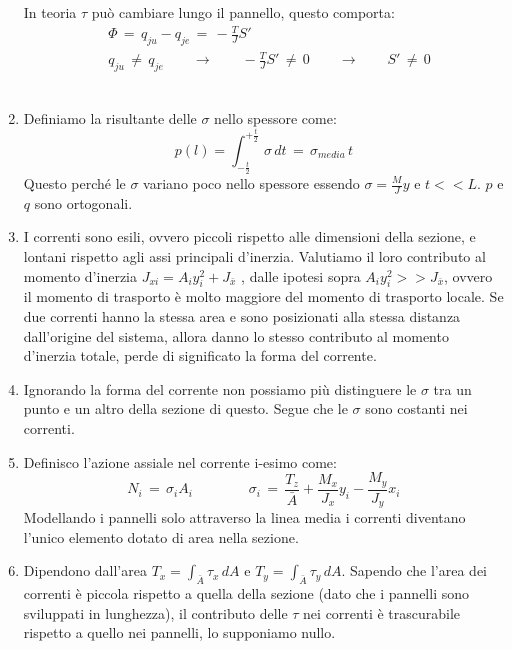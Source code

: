 \begin{enumerate}
    In teoria $\tau$ può cambiare lungo il pannello, questo comporta:
    \begin{align*}
        &\Phi\, = \, q_{ju} -q_{je}\,=\, -\frac{T}{J}S'\\
        &q_{ju} \,\neq\, q_{je}  \quad \quad \rightarrow  \quad \quad  -\frac{T}{J}S'\,\neq\, 0 \quad \quad \rightarrow  \quad \quad S'\,\neq\, 0
    \end{align*}\\
    \item Definiamo la risultante delle $\sigma$ nello spessore come:
    \begin{equation*}
        p(l) = \int_{-\frac{t}{2}}^{+\frac{t}{2}} \, \sigma \,dt\,= \, \sigma_{media} \,t
    \end{equation*}
    Questo perché le $\sigma$ variano poco nello spessore essendo $\sigma = \frac{M}{J}y$ e $t<<L$.
    $p$ e $q$ sono ortogonali.\\
    \item I correnti sono esili, ovvero piccoli rispetto alle dimensioni della sezione, e lontani rispetto agli assi principali d'inerzia. Valutiamo  il loro contributo al momento d'inerzia $J_{xi}= A_iy_i^2 + J_{\bar{x}}$ , dalle ipotesi sopra $A_iy_i^2 >> J_{\bar{x}}$, ovvero il momento di trasporto è molto maggiore del momento di trasporto locale. Se due correnti hanno la stessa area e sono posizionati alla stessa distanza dall'origine del sistema, allora danno lo stesso contributo al momento d'inerzia totale, perde di significato la forma del corrente.\\
    \item Ignorando la forma del corrente non possiamo più distinguere le $\sigma$ tra un punto e un altro della sezione di questo. Segue che le $\sigma$ sono costanti nei correnti.\\
    \item Definisco l'azione assiale nel corrente i-esimo come:
    \begin{equation*}
        N_i \,=\, \sigma_i A_i
        \quad  \quad  \quad  \quad
        \sigma_i\,=\,
         \frac{T_z}{ \bar{A}} 
        + \frac{M_x}{ J_x} y_i
        - \frac{M_y}{ J_y} x_i
    \end{equation*}
    Modellando i pannelli solo attraverso la linea media i correnti diventano l'unico elemento dotato di area nella sezione.   \\
    \item Dipendono dall'area $T_x = \int_{\bar{A}}\tau_x\,dA$ e  $T_y = \int_{\bar{A}}\tau_y\,dA$. Sapendo che l'area dei correnti è piccola rispetto a quella della sezione (dato che i pannelli sono sviluppati in lunghezza), il contributo delle $\tau$ nei correnti è trascurabile rispetto a quello nei pannelli, lo supponiamo nullo.
    
    
    
\end{enumerate}







